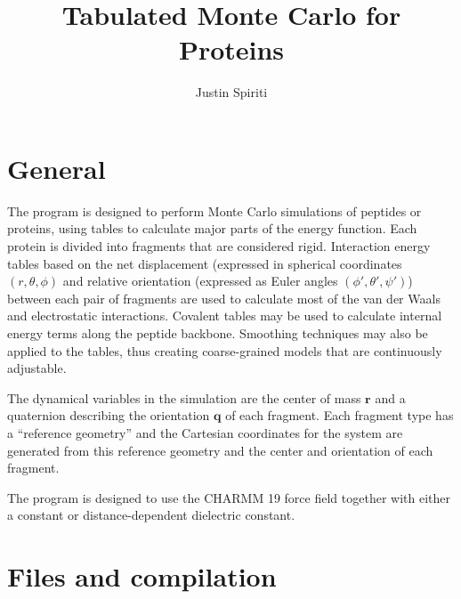 \documentclass{article}      %
\title{Tabulated Monte Carlo for Proteins}  %
\author{Justin Spiriti}      %
\begin{document}

\maketitle                   %

\section{General}

The program is designed to perform Monte Carlo simulations of peptides or proteins, using tables to calculate major parts of the energy function.  Each protein is divided into fragments that are considered rigid.  Interaction energy tables based on the net displacement (expressed in spherical coordinates $(r,\theta,\phi)$ and relative orientation (expressed as Euler angles $(\phi',\theta',\psi')$) between each pair of fragments are used to calculate most of the van der Waals and electrostatic interactions.  Covalent tables may be used to calculate internal energy terms along the peptide backbone.  Smoothing techniques may also be applied to the tables, thus creating coarse-grained models that are continuously adjustable.  

The dynamical variables in the simulation are the center of mass  $\mathbf{r}$ and a quaternion describing the orientation $\mathbf{q}$ of each fragment.  Each fragment type has a ``reference geometry'' and the Cartesian coordinates for the system are generated from this reference geometry and the center and orientation of each fragment.    

The program is designed to use the CHARMM 19 force field together with either a constant or distance-dependent dielectric constant.  

\section{Files and compilation}
\end{document}
